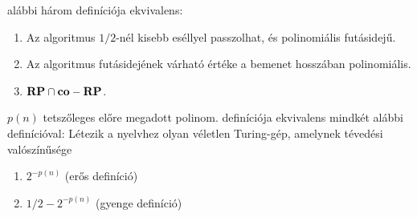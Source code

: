 \begin{Exercise}[counter={sorszam}, difficulty=0]
	\ZPP alábbi három definíciója ekvivalens:
	\begin{enumerate}
		\item Az algoritmus $1/2$-nél kisebb eséllyel passzolhat, és polinomiális futásidejű.
		\item Az algoritmus futásidejének várható értéke a bemenet hosszában polinomiális.
		\item $\mbox{\ensuremath{\mathbf{RP}}} \cap \mbox{\ensuremath{\mathbf{co-RP}}}$.
	\end{enumerate}
\end{Exercise}

\begin{Exercise}[counter={sorszam}, difficulty=0]
	$p(n)$ tetszőleges előre megadott polinom. \BPP definíciója ekvivalens mindkét alábbi
	definícióval: Létezik a nyelvhez olyan véletlen Turing-gép, amelynek tévedési valószínűsége
	\begin{enumerate}
		\item $2^{-p(n)}$ (erős \BPP definíció)
		\item $1/2-2^{-p(n)}$ (gyenge \BPP definíció)
	\end{enumerate}
\end{Exercise}


